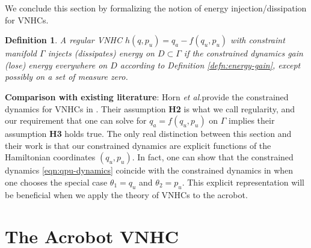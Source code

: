 \documentclass[journal,twoside,web]{ieeecolor}
\newtheorem{defn}{Definition} %
\newcommand*{\etal}{\MakeLowercase{\textit{et al.}}}
\begin{document}
We conclude this section by formalizing the notion of energy
injection/dissipation for VNHCs.

\begin{defn}\label{defn:energy-injection}
    A regular VNHC \(h(q,p_u) = q_a - f(q_u,p_u)\) with constraint manifold \(\Gamma\)
    \textit{injects (dissipates) energy on \(D \subset \Gamma\)} if the
    constrained dynamics gain (lose) energy everywhere on \(D\) according to
    Definition \ref{defn:energy-gain}, except possibly on a set of measure
    zero.
\end{defn}

\textbf{Comparison with existing literature}: Horn \etal provide the constrained
dynamics for VNHCs in \cite{nhvc_incline_walking}.
Their assumption \textbf{H2} is what we call regularity, and our requirement
that one can solve for \(q_a = f(q_u,p_u)\) on \(\Gamma\) implies their
assumption \textbf{H3} holds true.
The only real distinction between this section and their work is that
our constrained dynamics are explicit functions of the Hamiltonian coordinates
\((q_u,p_u)\).
In fact, one can show that the constrained dynamics \eqref{eqn:qpu-dynamics}
coincide with the constrained dynamics in
\cite[Eqn. (17)]{hybrid_zero_dynamics_bipedal_nhvcs}
when one chooses the special case \(\theta_1 = q_u\) and 
\(\theta_2 = p_u\).
This explicit representation will be beneficial when we apply the theory of
VNHCs to the acrobot.

\section{The Acrobot VNHC}\label{sec:acrobot}
\end{document}
